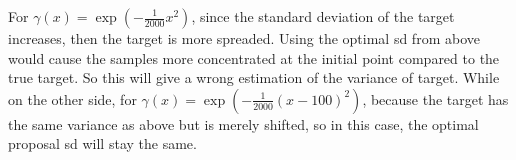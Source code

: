 \documentclass{article}
\begin{document}
For $\gamma(x) = \exp(-\frac1{2000}x^2)$, since the standard deviation of the target increases, then the target is more spreaded. Using the optimal sd from above would cause the samples more concentrated at the initial point compared to the true target. So this will give a wrong estimation of the variance of target. While on the other side, for $\gamma(x) = \exp(-\frac{1}{2000}(x - 100)^2)$, because the target has the same variance as above but is merely shifted, so in this case, the optimal proposal sd will stay the same.
 
\end{document}
